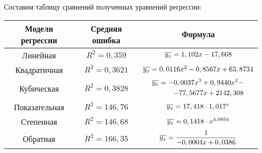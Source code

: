 \documentclass[utf8, a4paper, 14pt, russian, oneside]{book}
\begin{document}
Составим таблицу сравнений полученных уравнений регрессии:
{
\renewcommand{\arraystretch}{2}
\begin{table}[h!]
    \centering
    \begin{tabular}{|c|c|c|}
        \hline
        Модели регрессии & Средняя ошибка & Формула \\ \hline 
        Линейная & $R^2 = 0,359$ & $\overline{ y_x } = 1,102x - 17,668$ \\ \hline
        Квадратичная & $R^2 = 0,3621$ & $\overline{ y_x } = 0,0116x^2-0,8567x + 63,8734$ \\ \hline
        Кубическая & $R^2 = 0,3828$ & $\begin{aligned}
                                            \overline{ y_x } = -0,0037x^3 + 0,9440x^2 - \\
                                            - 77,5677x + 2142,308
                                        \end{aligned}$ \\ \hline
        Показательная & $R^2 = 146,76$ & $\overline{ y_x } = 17,418 \cdot 1,017^x$ \\ \hline
        Степенная & $R^2 = 146,68$ & $\overline{ y_x } = 0,1418 \cdot x^{4,0954}$ \\ \hline
        Обратная & $R^2 = 166,35$ & $\overline{ y_x } = \dfrac{1}{-0,0004x + 0,0386}$ \\ \hline
    \end{tabular}
\end{table}
}
\end{document}
